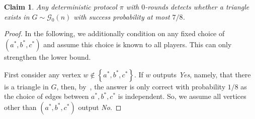 \documentclass[11pt]{article}
\newtheorem{claim}[lemma]{Claim}
\theoremstyle{definition}
\newcommand{\set}[1]{\ensuremath{\left\{ #1 \right\}}}
\newcommand{\prot}{\ensuremath{\pi}}
\newcommand{\astar}{\ensuremath{a^*}}
\newcommand{\bstar}{\ensuremath{b^*}}
\newcommand{\cstar}{\ensuremath{c^*}}
\newcommand{\cG}{\ensuremath{\mathcal{G}}}
\begin{document}
\begin{claim}\label{clm:0-round-prot}
	Any deterministic protocol $\prot$ with $0$-rounds detects whether a triangle exists in $G \sim \cG_0(n)$ with success probability at most $7/8$.
\end{claim}
\begin{proof}
	In the following, we  additionally condition on any fixed choice of $(\astar,\bstar,\cstar)$ and assume this choice is known to all players. This can only strengthen the lower bound. 
	
	First consider any vertex $w \notin \set{\astar,\bstar,\cstar}$. If $w$ outputs \emph{Yes}, namely, that there is a triangle in $G$, then, 
	by~, the answer is only correct with probability $1/8$ as the choice of edges between $\astar,\bstar,\cstar$ is independent. So, we assume all vertices other than $(\astar,\bstar,\cstar)$ output \emph{No}. 
	

\end{proof}
\end{document}
